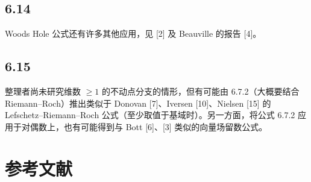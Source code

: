 \subsection*{6.14}
Woods Hole 公式还有许多其他应用，见 [2] 及 Beauville 的报告 [4]。


\subsection*{6.15}

整理者尚未研究维数 $\geq1$ 的不动点分支的情形，但有可能由 6.7.2（大概要结合 Riemann--Roch）推出类似于 Donovan [7]、Iversen [10]、Nielsen [15] 的 Lefschetz--Riemann--Roch 公式（至少取值于基域时）。另一方面，将公式 6.7.2 应用于对偶数上，也有可能得到与 Bott [6]、[3] 类似的向量场留数公式。


\section*{参考文献}
